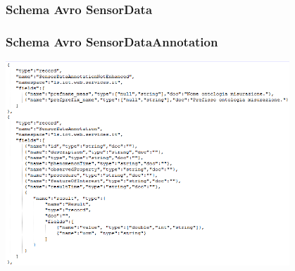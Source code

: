 \documentclass{beamer}
\begin{document}
\begin{frame}
\frametitle{Schema Avro SensorData}
\begin{figure}%
	\centering
	\qquad
\end{figure}
\end{frame}

\begin{frame}
\frametitle{Schema Avro SensorDataAnnotation}
\includegraphics[width=0.8\textwidth]{images/sensordataannotation.png}
\end{frame}
\end{document}
